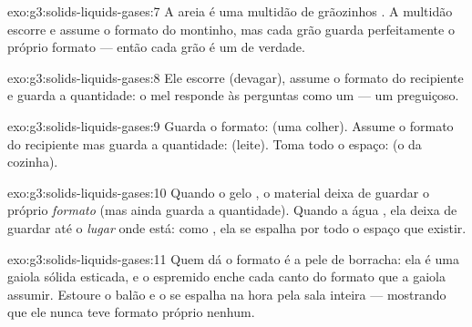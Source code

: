 \begin{solution}{exo:g3:solids-liquids-gases:7}
A areia é uma multidão de grãozinhos . A multidão escorre e
assume o formato do montinho, mas cada grão guarda perfeitamente o
próprio formato --- então cada grão é um  de verdade.
\end{solution}

\begin{solution}{exo:g3:solids-liquids-gases:8}
Ele escorre (devagar), assume o formato do recipiente e guarda a
quantidade: o mel responde às perguntas como um  --- um
 preguiçoso.
\end{solution}

\begin{solution}{exo:g3:solids-liquids-gases:9}
Guarda o formato:  (uma colher). Assume o formato do recipiente
mas guarda a quantidade:  (leite). Toma todo o espaço:  (o
 da cozinha).
\end{solution}

\begin{solution}{exo:g3:solids-liquids-gases:10}
Quando o gelo , o material deixa de guardar o próprio
\emph{formato} (mas ainda guarda a quantidade). Quando a água ,
ela deixa de guardar até o \emph{lugar} onde está: como , ela se
espalha por todo o espaço que existir.
\end{solution}

\begin{solution}{exo:g3:solids-liquids-gases:11}
Quem dá o formato é a pele de borracha: ela é uma gaiola sólida
esticada, e o  espremido enche cada canto do formato que a gaiola
assumir. Estoure o balão e o  se espalha na hora pela sala inteira
--- mostrando que ele nunca teve formato próprio nenhum.
\end{solution}

